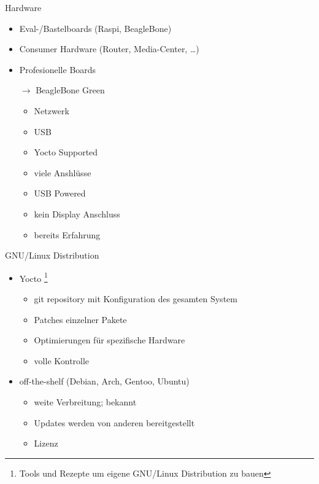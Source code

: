 \begin{frame}{Hardware}
	\begin{itemize}
		\item Eval-/Bastelboards (Raspi, BeagleBone)
		\item Consumer Hardware (Router, Media-Center, \ldots)
		\item Profesionelle Boards
		\item[$\rightarrow$] BeagleBone Green
		\begin{itemize}
			\item Netzwerk
			\item USB
			\item Yocto Supported
			\item viele Anshlüsse
			\item USB Powered
			\item kein Display Anschluss
			\item bereits Erfahrung
		\end{itemize}
	\end{itemize}
\end{frame}

\begin{frame}{GNU/Linux Distribution}
	\begin{itemize}
		\item Yocto\cite{whyYocto} \footnote{Tools und Rezepte um eigene GNU/Linux Distribution zu bauen}
		\begin{itemize}
			\item git repository mit Konfiguration des gesamten System
			\item Patches einzelner Pakete
			\item Optimierungen für spezifische Hardware
			\item volle Kontrolle
		\end{itemize}
		\item off-the-shelf (Debian, Arch, Gentoo, Ubuntu)
		\begin{itemize}
			\item weite Verbreitung; bekannt
			\item Updates werden von anderen bereitgestellt
			\item Lizenz
		\end{itemize}
	\end{itemize}
\end{frame}

